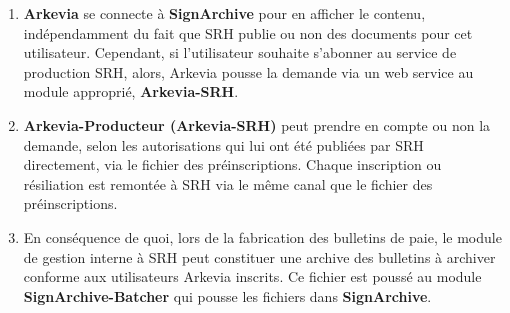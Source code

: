 \begin{enumerate}
    \item  \textbf{Arkevia} se connecte à \textbf{SignArchive} pour en afficher le contenu, indépendamment du fait que SRH publie ou non des documents pour cet utilisateur. Cependant, si l’utilisateur souhaite s’abonner au service de production SRH, alors, Arkevia pousse la demande via un web service au module approprié, \textbf{Arkevia-SRH}.

    \item \textbf{Arkevia-Producteur (Arkevia-SRH)} peut prendre en compte ou non la demande, selon les autorisations qui lui ont été publiées par SRH directement, via le fichier des préinscriptions. Chaque inscription ou résiliation est remontée à SRH via le même canal que le fichier des préinscriptions.

    \item En conséquence de quoi, lors de la fabrication des bulletins de paie, le module de gestion interne à SRH peut constituer une archive des bulletins à archiver conforme aux utilisateurs Arkevia inscrits. Ce fichier est poussé au module \textbf{SignArchive-Batcher} qui pousse les fichiers dans \textbf{SignArchive}.
\end{enumerate}
